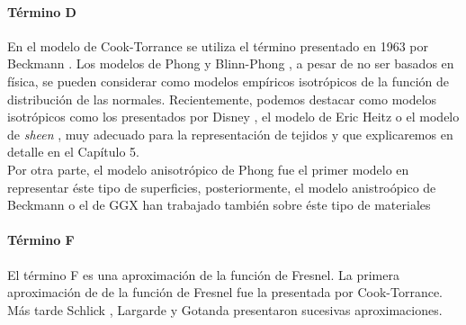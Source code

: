             \paragraph*{\hspace*{1.5em}T\'ermino D}
                En el modelo de Cook-Torrance \autocite{cooktorrance} se utiliza el t\'ermino presentado en 1963 por Beckmann \autocite{beckmann}.
                Los modelos de Phong \autocite{phong} y Blinn-Phong \autocite{blinnphong}, a pesar de no ser basados en f\'isica, se pueden considerar
                como modelos emp\'iricos isotr\'opicos de la funci\'on de distribuci\'on de las normales.
                Recientemente, podemos destacar como modelos isotr\'opicos como los presentados por Disney \autocite{disney12}, el modelo
                de Eric Heitz \autocite{ggx} o el modelo de \textit{sheen} \autocite{sheenbrdf}, muy adecuado para la representaci\'on de tejidos
                y que explicaremos en detalle en el Cap\'itulo 5.\\
                \hspace*{1.5em}Por otra parte, el modelo anisotr\'opico de Phong \autocite{anisotropicphong} fue el primer modelo en representar
                \'este tipo de superficies, posteriormente, el modelo anistro\'opico de Beckmann \autocite{beckmannspinozo} o el de
                GGX \autocite{anisotropicggx} han trabajado tambi\'en sobre \'este tipo de materiales


            \paragraph*{\hspace*{1.5em}T\'ermino F}
                El t\'ermino F es una aproximaci\'on de la funci\'on de Fresnel. La primera aproximaci\'on de de la funci\'on de Fresnel
                fue la presentada por Cook-Torrance. M\'as tarde Schlick \autocite{schlick}, Largarde \autocite{frostbite} y Gotanda \autocite{gotanda}
                presentaron sucesivas aproximaciones.

